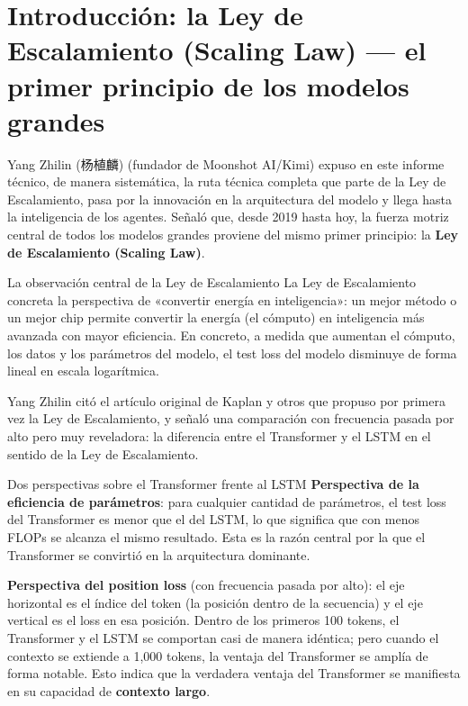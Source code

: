 \section{Introducción: la Ley de Escalamiento (Scaling Law) — el primer principio de los modelos grandes}

Yang Zhilin (杨植麟) (fundador de Moonshot AI/Kimi) expuso en este informe técnico, de manera sistemática, la ruta técnica completa que parte de la Ley de Escalamiento, pasa por la innovación en la arquitectura del modelo y llega hasta la inteligencia de los agentes. Señaló que, desde 2019 hasta hoy, la fuerza motriz central de todos los modelos grandes proviene del mismo primer principio: la \textbf{Ley de Escalamiento (Scaling Law)}.

\begin{importantbox}{La observación central de la Ley de Escalamiento}
La Ley de Escalamiento concreta la perspectiva de «convertir energía en inteligencia»: un mejor método o un mejor chip permite convertir la energía (el cómputo) en inteligencia más avanzada con mayor eficiencia. En concreto, a medida que aumentan el cómputo, los datos y los parámetros del modelo, el test loss del modelo disminuye de forma lineal en escala logarítmica.
\end{importantbox}

Yang Zhilin citó el artículo original de Kaplan y otros que propuso por primera vez la Ley de Escalamiento, y señaló una comparación con frecuencia pasada por alto pero muy reveladora: la diferencia entre el Transformer y el LSTM en el sentido de la Ley de Escalamiento.

\begin{knowledgebox}{Dos perspectivas sobre el Transformer frente al LSTM}
\textbf{Perspectiva de la eficiencia de parámetros}: para cualquier cantidad de parámetros, el test loss del Transformer es menor que el del LSTM, lo que significa que con menos FLOPs se alcanza el mismo resultado. Esta es la razón central por la que el Transformer se convirtió en la arquitectura dominante.

\textbf{Perspectiva del position loss} (con frecuencia pasada por alto): el eje horizontal es el índice del token (la posición dentro de la secuencia) y el eje vertical es el loss en esa posición. Dentro de los primeros 100 tokens, el Transformer y el LSTM se comportan casi de manera idéntica; pero cuando el contexto se extiende a 1,000 tokens, la ventaja del Transformer se amplía de forma notable. Esto indica que la verdadera ventaja del Transformer se manifiesta en su capacidad de \textbf{contexto largo}.
\end{knowledgebox}

